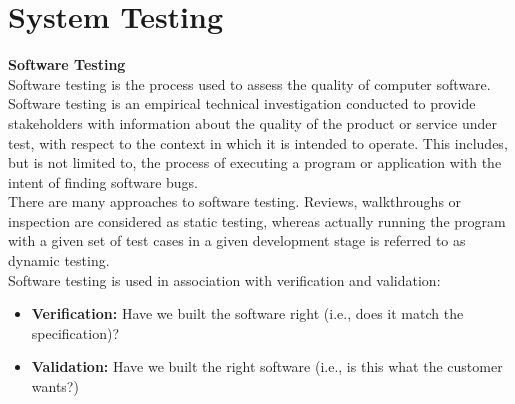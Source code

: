 \chapter{System Testing}
\textbf{Software Testing}
\\\hspace*{0.82cm}Software testing is the process used to assess the quality of computer software. Software testing is an empirical 
technical investigation conducted to provide stakeholders with information about the quality of the product or service under test, 
with respect to the context in which it is intended to operate. This includes, but is not limited to, the process of executing a 
program or application with the intent of finding software bugs.\\[0.5cm]
\hspace*{0.82cm}There are many approaches to software testing. Reviews, walkthroughs or inspection are considered as static testing, 
whereas actually running the program with a given set of test cases in a given development stage is referred to as dynamic 
testing.\\[0.5cm]
Software testing is used in association with verification and validation:
\begin{itemize}
 \item \textbf{Verification: }Have we built the software right (i.e., does it match the specification)?
 \item \textbf{Validation: }Have we built the right software (i.e., is this what the customer wants?)
\end{itemize}


